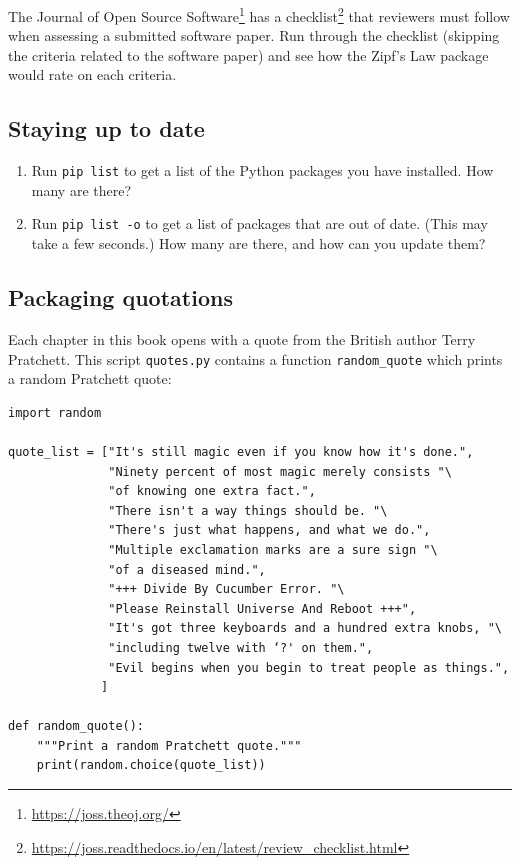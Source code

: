 \documentclass[
]{krantz}
\renewcommand{\href}[2]{#2\footnote{\url{#1}}}
\begin{document}
The \href{https://joss.theoj.org/}{Journal of Open Source Software} has a \href{https://joss.readthedocs.io/en/latest/review_checklist.html}{checklist}
that reviewers must follow when assessing a submitted software paper.
Run through the checklist (skipping the criteria related to the software paper)
and see how the Zipf's Law package would rate on each criteria.

\hypertarget{packaging-ex-up-to-date}{%
\subsection{Staying up to date}\label{packaging-ex-up-to-date}}

\begin{enumerate}
\def\labelenumi{\arabic{enumi}.}
\item
  Run \texttt{pip\ list} to get a list of the Python packages you have installed.
  How many are there?
\item
  Run \texttt{pip\ list\ -o} to get a list of packages that are out of date.
  (This may take a few seconds.)
  How many are there,
  and how can you update them?
\end{enumerate}

\hypertarget{packaging-ex-pratchett}{%
\subsection{Packaging quotations}\label{packaging-ex-pratchett}}

Each chapter in this book opens with a quote from the British author Terry Pratchett.
This script \texttt{quotes.py} contains a function \texttt{random\_quote} which prints a random Pratchett quote:

\begin{verbatim}
import random

quote_list = ["It's still magic even if you know how it's done.",
              "Ninety percent of most magic merely consists "\
              "of knowing one extra fact.",
              "There isn't a way things should be. "\
              "There's just what happens, and what we do.",
              "Multiple exclamation marks are a sure sign "\
              "of a diseased mind.",
              "+++ Divide By Cucumber Error. "\
              "Please Reinstall Universe And Reboot +++",
              "It's got three keyboards and a hundred extra knobs, "\
              "including twelve with ‘?' on them.",
              "Evil begins when you begin to treat people as things.",
             ]
                         
def random_quote():
    """Print a random Pratchett quote."""
    print(random.choice(quote_list))
\end{verbatim}
\end{document}
